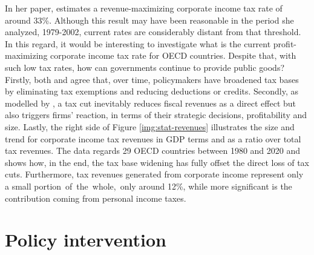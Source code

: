 In her paper, \textcite{clausing} estimates a revenue-maximizing corporate income tax rate of around 33\%. Although this result may have been reasonable in the period she analyzed, 1979-2002, current rates are considerably distant from that threshold. In this regard, it would be interesting to investigate what is the current profit-maximizing corporate income tax rate for OECD countries. Despite that, with such low tax rates, how can governments continue to provide public goods? Firstly, both \textcite{dev-loc-red-08} and \textcite{clausing} agree that, over time, policymakers have broadened tax bases by eliminating tax exemptions and reducing deductions or credits. Secondly, as modelled by \textcite{clausing}, a tax cut inevitably reduces fiscal revenues as a direct effect but also triggers firms' reaction, in terms of their strategic decisions, profitability and size. Lastly, the right side of Figure \ref{img:stat-revenues} illustrates the size and trend for corporate income tax revenues in GDP terms and as a ratio over total tax revenues. The data regards 29 OECD countries between 1980 and 2020 and shows how, in the end, the tax base widening has fully offset the direct loss of tax cuts. Furthermore, tax revenues generated from corporate income represent only a small portion~of~the~whole,~only around 12\%, while more significant is the contribution coming from personal income taxes.

\vspace{-10pt}
\section{Policy intervention}
\vspace{-10pt}

